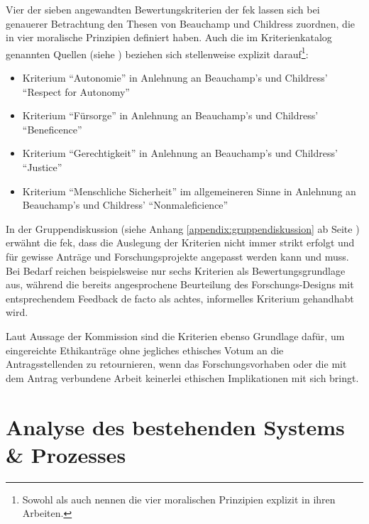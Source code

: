 \documentclass[a4paper,12pt,twoside]{scrreprt}
\begin{document}
Vier der sieben angewandten Bewertungskriterien der \ac{fek} lassen sich bei genauerer Betrachtung den Thesen von Beauchamp und Childress zuordnen, die in \cite{beauchamp_principles_1994} vier moralische Prinzipien definiert haben. Auch die im Kriterienkatalog genannten Quellen (siehe \cite[2]{forschungsethik-kommission_der_fachhochschule_vorarlberg_kriterienkatalog_2021}) beziehen sich stellenweise explizit darauf\footnote{Sowohl \cite{marckmann_was_2000} als auch \cite{schuchter_care_2018} nennen die vier moralischen Prinzipien explizit in ihren Arbeiten.}:
\begin{itemize}
    \item Kriterium \enquote{Autonomie} in Anlehnung an Beauchamp's und Childress' \enquote{Respect for Autonomy} \cite[101-149]{beauchamp_principles_1994}
    \item Kriterium \enquote{Fürsorge} in Anlehnung an Beauchamp's und Childress' \enquote{Beneficence} \cite[202-248]{beauchamp_principles_1994}
    \item Kriterium \enquote{Gerechtigkeit} in Anlehnung an Beauchamp's und Childress' \enquote{Justice} \cite[249-301]{beauchamp_principles_1994}
    \item Kriterium \enquote{Menschliche Sicherheit} im allgemeineren Sinne in Anlehnung an Beauchamp's und Childress' \enquote{Nonmaleficience} \cite[150-201]{beauchamp_principles_1994}
\end{itemize}

In der Gruppendiskussion (siehe Anhang \ref{appendix:gruppendiskussion} ab Seite \pageref{appendix:gruppendiskussion}) erwähnt die \acl{fek}, dass die Auslegung der Kriterien nicht immer strikt erfolgt und für gewisse Anträge und Forschungsprojekte angepasst werden kann und muss. Bei Bedarf reichen beispielsweise nur sechs Kriterien als Bewertungsgrundlage aus, während die bereits angesprochene Beurteilung des Forschungs-Designs mit entsprechendem Feedback de facto als achtes, informelles Kriterium gehandhabt wird.

Laut Aussage der Kommission sind die Kriterien ebenso Grundlage dafür, um eingereichte Ethikanträge ohne jegliches ethisches Votum an die Antragsstellenden zu retournieren, wenn das Forschungsvorhaben oder die mit dem Antrag verbundene Arbeit keinerlei ethischen Implikationen mit sich bringt.

\cleardoublepage
\chapter{Analyse des bestehenden Systems \& Prozesses}
\label{chap:analyse-bestehendes-system-prozess}
\end{document}
